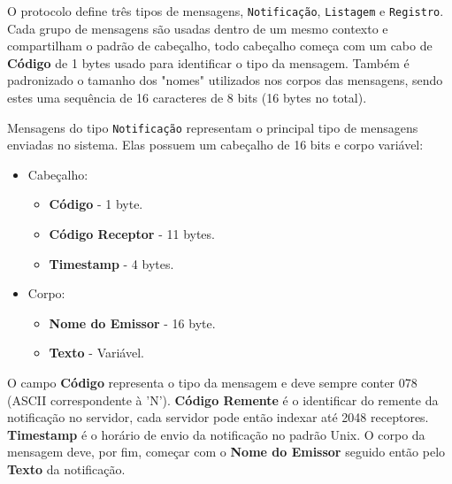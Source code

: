 \documentclass[12pt]{article}
\begin{document}
O protocolo define três tipos de mensagens,
{\tt Notificação}, {\tt Listagem} e {\tt Registro}.
Cada grupo de mensagens são usadas dentro de um mesmo contexto e compartilham o padrão de cabeçalho,
todo cabeçalho começa com um cabo de {\bf Código} de 1 bytes usado para identificar o tipo da mensagem.
Também é padronizado o tamanho dos "nomes" utilizados nos corpos das mensagens,
sendo estes uma sequência de 16 caracteres de 8 bits (16 bytes no total).

Mensagens do tipo {\tt Notificação} representam o principal tipo de mensagens enviadas no sistema.
Elas possuem um cabeçalho de 16 bits e corpo variável:
\begin{itemize}
\item Cabeçalho:
	\begin{itemize}
	\item {\bf Código} - 1 byte.
	\item {\bf Código Receptor} - 11 bytes.
	\item {\bf Timestamp} - 4 bytes.
	\end{itemize}
\item Corpo:
	\begin{itemize}
	\item {\bf Nome do Emissor} - 16 byte.
	\item {\bf Texto} - Variável.
	\end{itemize}
\end{itemize}
O campo {\bf Código} representa o tipo da mensagem e deve sempre conter 078 (ASCII correspondente à 'N').
{\bf Código Remente} é o identificar do remente da notificação no servidor,
cada servidor pode então indexar até 2048 receptores.
{\bf Timestamp} é o horário de envio da notificação no padrão Unix.
O corpo da mensagem deve, por fim, começar com o {\bf Nome do Emissor} seguido então pelo {\bf Texto} da notificação.
\end{document}
